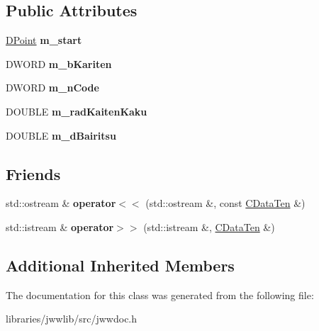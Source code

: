 \subsection*{Public Attributes}
\begin{DoxyCompactItemize}
\item 
\hypertarget{classCDataTen_af61df7cfeabdcf6fe6162a229ee476ba}{\hyperlink{struct__DPoint}{D\-Point} {\bfseries m\-\_\-start}}\label{classCDataTen_af61df7cfeabdcf6fe6162a229ee476ba}

\item 
\hypertarget{classCDataTen_a50d843dcb74d12d0007b08b1000648fe}{D\-W\-O\-R\-D {\bfseries m\-\_\-b\-Kariten}}\label{classCDataTen_a50d843dcb74d12d0007b08b1000648fe}

\item 
\hypertarget{classCDataTen_afe7b35842fc4a4b4906bab0e1ca39381}{D\-W\-O\-R\-D {\bfseries m\-\_\-n\-Code}}\label{classCDataTen_afe7b35842fc4a4b4906bab0e1ca39381}

\item 
\hypertarget{classCDataTen_aa3d6d71c11dc418e66a6beb85f09f504}{D\-O\-U\-B\-L\-E {\bfseries m\-\_\-rad\-Kaiten\-Kaku}}\label{classCDataTen_aa3d6d71c11dc418e66a6beb85f09f504}

\item 
\hypertarget{classCDataTen_a2fb06d6bdcfcd4fbfb4fcfe3e29ceb83}{D\-O\-U\-B\-L\-E {\bfseries m\-\_\-d\-Bairitsu}}\label{classCDataTen_a2fb06d6bdcfcd4fbfb4fcfe3e29ceb83}

\end{DoxyCompactItemize}
\subsection*{Friends}
\begin{DoxyCompactItemize}
\item 
\hypertarget{classCDataTen_ac397e5ddf7e3d85c1e404b837df23c07}{std\-::ostream \& {\bfseries operator$<$$<$} (std\-::ostream \&, const \hyperlink{classCDataTen}{C\-Data\-Ten} \&)}\label{classCDataTen_ac397e5ddf7e3d85c1e404b837df23c07}

\item 
\hypertarget{classCDataTen_a3af306fefcec926c0a8070eb2970013b}{std\-::istream \& {\bfseries operator$>$$>$} (std\-::istream \&, \hyperlink{classCDataTen}{C\-Data\-Ten} \&)}\label{classCDataTen_a3af306fefcec926c0a8070eb2970013b}

\end{DoxyCompactItemize}
\subsection*{Additional Inherited Members}


The documentation for this class was generated from the following file\-:\begin{DoxyCompactItemize}
\item 
libraries/jwwlib/src/jwwdoc.\-h\end{DoxyCompactItemize}
